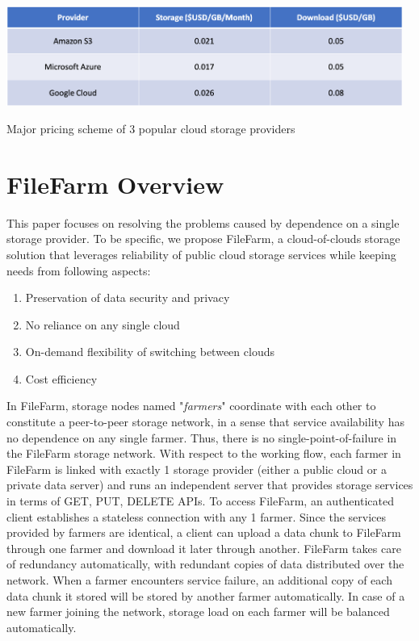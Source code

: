 \begin{table}[!b]
\centering
  \includegraphics[width=13cm]{tables/table_cloud_storage_cost.png}
  \caption{Major pricing scheme of 3 popular cloud storage providers}
  \label{table:cloudstoragecost}
\end{table}

\newpage

\section{FileFarm Overview}
\label{s:filefarmoverview}
This paper focuses on resolving the problems caused by dependence on a single storage provider. To be specific, we propose FileFarm, a cloud-of-clouds storage solution that leverages reliability of public cloud storage services while keeping needs from following aspects:

\begin{enumerate}
    \item Preservation of data security and privacy
    \item No reliance on any single cloud
    \item On-demand flexibility of switching between clouds
    \item Cost efficiency
\end{enumerate}

In FileFarm, storage nodes named "\textit{farmers}" coordinate with each other to constitute a peer-to-peer storage network, in a sense that service availability has no dependence on any single farmer. Thus, there is no single-point-of-failure in the FileFarm storage network. With respect to the working flow, each farmer in FileFarm is linked with exactly 1 storage provider (either a public cloud or a private data server) and runs an independent server that provides storage services in terms of GET, PUT, DELETE APIs. To access FileFarm, an authenticated client establishes a stateless connection with any 1 farmer. Since the services provided by farmers are identical, a client can upload a data chunk to FileFarm through one farmer and download it later through another. FileFarm takes care of redundancy automatically, with redundant copies of data distributed over the network. When a farmer encounters service failure, an additional copy of each data chunk it stored will be stored by another farmer automatically. In case of a new farmer joining the network, storage load on each farmer will be balanced automatically.
